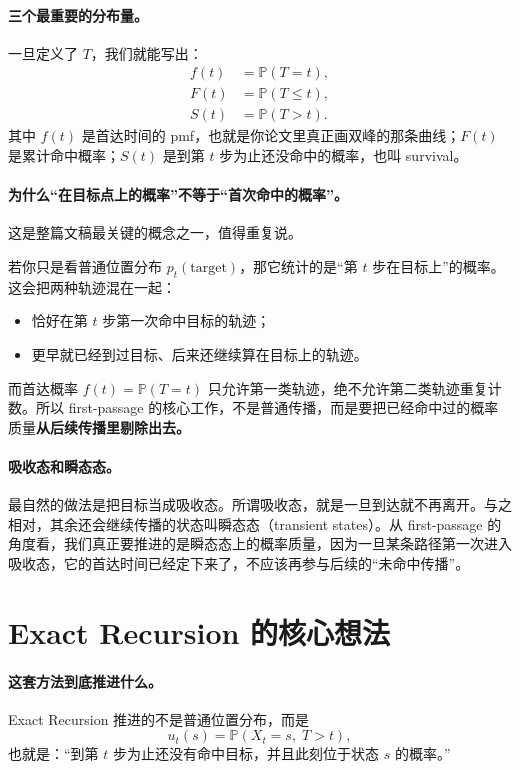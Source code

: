 \documentclass[11pt,fontset=fandol]{ctexart}
\begin{document}
\paragraph{三个最重要的分布量。}
一旦定义了 $T$，我们就能写出：
\begin{align}
  f(t) &= \mathbb P(T=t), \label{eq:fpt-pmf}\\
  F(t) &= \mathbb P(T\le t), \label{eq:fpt-cdf}\\
  S(t) &= \mathbb P(T>t). \label{eq:survival-def}
\end{align}
其中 $f(t)$ 是首达时间的 pmf，也就是你论文里真正画双峰的那条曲线；$F(t)$ 是累计命中概率；$S(t)$ 是到第 $t$ 步为止还没命中的概率，也叫 survival。

\paragraph{为什么“在目标点上的概率”不等于“首次命中的概率”。}
这是整篇文稿最关键的概念之一，值得重复说。

若你只是看普通位置分布 $p_t(\text{target})$，那它统计的是“第 $t$ 步在目标上”的概率。这会把两种轨迹混在一起：
\begin{itemize}
  \item 恰好在第 $t$ 步第一次命中目标的轨迹；
  \item 更早就已经到过目标、后来还继续算在目标上的轨迹。
\end{itemize}
而首达概率 $f(t)=\mathbb P(T=t)$ 只允许第一类轨迹，绝不允许第二类轨迹重复计数。所以 first-passage 的核心工作，不是普通传播，而是要把已经命中过的概率质量\textbf{从后续传播里剔除出去。}

\paragraph{吸收态和瞬态态。}
最自然的做法是把目标当成吸收态。所谓吸收态，就是一旦到达就不再离开。与之相对，其余还会继续传播的状态叫瞬态态（transient states）。从 first-passage 的角度看，我们真正要推进的是瞬态态上的概率质量，因为一旦某条路径第一次进入吸收态，它的首达时间已经定下来了，不应该再参与后续的“未命中传播”。

\section{Exact Recursion 的核心想法}
\paragraph{这套方法到底推进什么。}
Exact Recursion 推进的不是普通位置分布，而是
\begin{equation}
  u_t(s)=\mathbb P(X_t=s,\;T>t),
  \label{eq:unabsorbed-dist}
\end{equation}
也就是：“到第 $t$ 步为止还没有命中目标，并且此刻位于状态 $s$ 的概率。”
\end{document}
